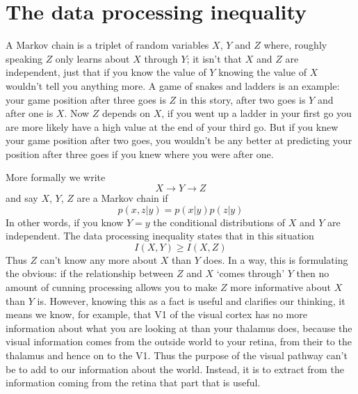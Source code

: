 \documentclass[12pt]{article}
\begin{document}
\section*{The data processing inequality}

A Markov chain is a triplet of random variables $X$, $Y$ and $Z$
where, roughly speaking $Z$ only learns about $X$ through $Y$; it isn't
that $X$ and $Z$ are independent, just that if you know the value of
$Y$ knowing the value of $X$ wouldn't tell you anything more. A game of
snakes and ladders is an example: your game position after three goes
is $Z$ in this story, after two goes is $Y$ and after one is $X$. Now
$Z$ depends on $X$, if you went up a ladder in your first go you are
more likely have a high value at the end of your third go. But if you
knew your game position after two goes, you wouldn't be any better at
predicting your position after three goes if you knew where you were
after one.

More formally we write
\begin{equation}
X\rightarrow Y \rightarrow Z
\end{equation}
and say $X$, $Y$, $Z$ are a Markov chain if
\begin{equation}
p(x,z|y)=p(x|y)p(z|y)
\end{equation}
In other words, if you know $Y=y$ the conditional distributions of $X$
and $Y$ are independent. The data processing inequality states that in
this situation
\begin{equation}
I(X,Y)\ge I(X,Z)
\end{equation}
Thus $Z$ can't know any more about $X$ than $Y$ does. In a way, this
is formulating the obvious: if the relationship between $Z$ and $X$
\lq{}comes through\rq{} $Y$ then no amount of cunning processing
allows you to make $Z$ more informative about $X$ than $Y$
is. However, knowing this as a fact is useful and clarifies our
thinking, it means we know, for example, that V1 of the visual
cortex has no more information about what you are looking at than your
thalamus does, because the visual information comes from the outside
world to your retina, from their to the thalamus and hence on to the
V1. Thus the purpose of the visual pathway can't be to add to our
information about the world. Instead, it is to extract from the
information coming from the retina that part that is useful.


{}
\end{document}
